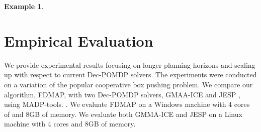 \documentclass[letterpaper]{article} %
\theoremstyle{definition}
\newtheorem{example}{Example}
\newcommand{\commentout}[1]{}
\begin{document}
\begin{example}
\end{example}

\commentout{
\begin{algorithm}
\caption{Alignment Iteration}
\begin{algorithmic}[tbph]
\State Input: PolicyGraphs $G_1, ..., G_M$
\For{$G_i,  i\in\{1, ..., M\}$}
	\State {$\mathit{NoopsReqs} \gets \mathit{VertexToIntMapping}$}
      \State {$\mathit{CurrBFS} \gets \Call{BFS}{G_i}$}
      \While {$\mathit{CurrBFS.queue}$ is not empty}
	\State {$v \gets \mathit{CurrBFS.queue.pop}$}
	\State {$a \gets v.action$}
	\If {$a$ is public action}
	\State {$\mathit{identifier} \gets \Call{GetIdentifier}{v}$}
	\State {$\mathit{MaxNoop} \gets 0$}
	\For {$G_j,  j\in\{1, ..., M\}\setminus\{i\}$}
	\State {$\mathit{CurrNoop} \gets \Call{NoopReq}{G_j, \mathit{identifier}}$}
	\State {$\mathit{MaxNoop} \gets max(\mathit{MaxNoop}, \mathit{CurrNoop})$}
	\EndFor
	\State {$\mathit{NoopsReqs}[v] \gets \mathit{MaxNoop} - \mathit{CompensationTerm}$}
	\EndIf
	\EndWhile
	\State {$G_i' \gets \Call{AddNoops}{G_i, \mathit{NoopsReqs}}$}
\EndFor
\State {return $G_1', ..., G_M'$}
\end{algorithmic}
\end{algorithm}
}

\section{Empirical Evaluation}

We provide experimental results focusing on longer planning horizons and scaling up with respect to current Dec-POMDP solvers.
The experiments were conducted on a variation of the popular cooperative box pushing problem.
We compare our algorithm, FDMAP, with two Dec-POMDP solvers, GMAA-ICE \cite{GMAAICE} and JESP \cite{JESP}, using MADP-tools. \cite{MADP}.
We evaluate FDMAP on a Windows machine with 4 cores of and 8GB of memory. We evaluate both GMMA-ICE and JESP on a Linux machine with 4 cores and 8GB of memory.
\end{document}
